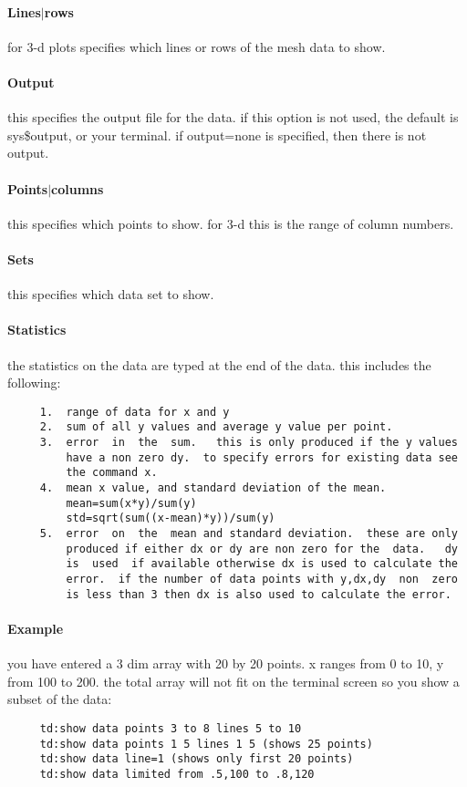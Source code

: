 \paragraph{Lines$|$rows}
for 3-d plots specifies which lines or rows of the mesh data to show. 
\paragraph{Output}
this  specifies  the output file for the data.  if this option is not
used, the default is sys\$output, or your terminal.  if output=none is
specified, then there is not output.  
\paragraph{Points$|$columns}
this  specifies  which  points to show.  for 3-d this is the range of
column numbers.  
\paragraph{Sets}
this specifies which data set to show.  
\paragraph{Statistics}
the  statistics  on  the data are typed at the end of the data.  this
includes the following:  
\begin{verbatim}
     1.  range of data for x and y 
     2.  sum of all y values and average y value per point.  
     3.  error  in  the  sum.   this is only produced if the y values
         have a non zero dy.  to specify errors for existing data see
         the command x.  
     4.  mean x value, and standard deviation of the mean.  
         mean=sum(x*y)/sum(y) 
         std=sqrt(sum((x-mean)*y))/sum(y) 
     5.  error  on  the  mean and standard deviation.  these are only
         produced if either dx or dy are non zero for the  data.   dy
         is  used  if available otherwise dx is used to calculate the
         error.  if the number of data points with y,dx,dy  non  zero
         is less than 3 then dx is also used to calculate the error. 
\end{verbatim}
\paragraph{Example}
you have entered a 3 dim array with 20 by 20 points.  x ranges from 0
to 10, y from 100 to 200.  the  total  array  will  not  fit  on  the
terminal screen so you show a subset of the data:  
\begin{verbatim}
     td:show data points 3 to 8 lines 5 to 10 
     td:show data points 1 5 lines 1 5 (shows 25 points) 
     td:show data line=1 (shows only first 20 points) 
     td:show data limited from .5,100 to .8,120 
\end{verbatim}

